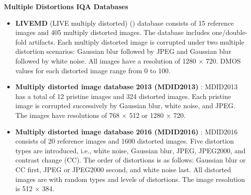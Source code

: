 \textbf{Multiple Distortions IQA Databases}
\begin{itemize}
    \item \textbf{LIVEMD} (LIVE multiply distorted) (\cite{LIVEMD}) database consists of 15 reference images and 405 multiply distorted images. The database includes one/double-fold artifacts. Each multiply distorted image is corrupted under two multiple distortion scenarios: Gaussian blur followed by JPEG and Gaussian blur followed by white noise. All images have a resolution of 1280 $\times$ 720. DMOS values for each distorted image range from 0 to 100.
    \item \textbf{Multiply distorted image database 2013 (MDID2013)} \cite{MDID2013}: MDID2013 has a total of 12 pristine images and 324 distorted images. Each pristine image is corrupted successively by Gaussian blur, white noise, and JPEG. The images have resolutions of 768 $\times$ 512 or 1280 $\times$ 720.
    \item \textbf{Multiply distorted image database 2016 (MDID2016)} \cite{MDID2016}: MDID2016 consists of 20 reference images and 1600 distorted images. Five distortion types are introduced, i.e., white noise, Gaussian blur, JPEG, JPEG2000, and contrast change (CC). The order of distortions is as follows: Gaussian blur or CC first, JPEG or JPEG2000 second, and white noise last. All distorted images are with random types and levels of distortions. The image resolution is 512 $\times$ 384.
\end{itemize}

